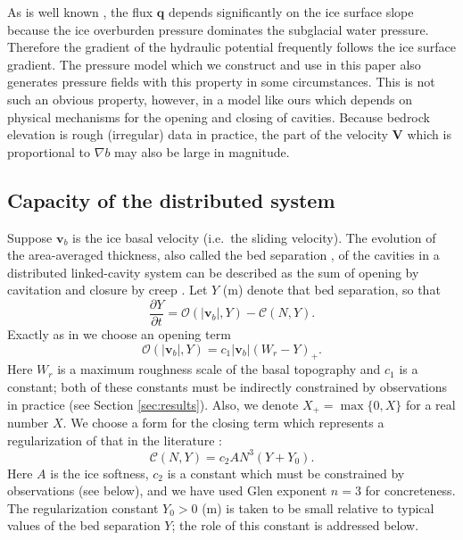 \documentclass[11pt,final]{amsart}
\newcommand\bv{\mathbf{v}}
\newcommand\bV{\mathbf{V}}
\newcommand\bq{\mathbf{q}}
\newcommand{\grad}{\nabla}
\begin{document}
As is well known \citep{Clarke05}, the flux $\bq$ depends significantly on the ice surface slope because the ice overburden pressure dominates the subglacial water pressure.  Therefore the gradient of the hydraulic potential frequently follows the ice surface gradient.  The pressure model which we construct and use in this paper also generates pressure fields with this property in some circumstances.  This is not such an obvious property, however, in a model like ours which depends on physical mechanisms for the opening and closing of cavities.  Because bedrock elevation is rough (irregular) data in practice, the part of the velocity $\bV$ which is proportional to $\grad b$ may also be large in magnitude.



\subsection*{Capacity of the distributed system}  Suppose $\bv_b$ is the ice basal velocity (i.e.~the sliding velocity).  The evolution of the area-averaged thickness, also called the bed separation \citep{Bartholomausetal2011}, of the cavities in a distributed linked-cavity system \citep{Schoofetal2012} can be described as the sum of opening by cavitation and closure by creep \citep{Hewitt2011}.  Let $Y$ (m) denote that bed separation, so that
\begin{equation}
\frac{\partial Y}{\partial t} = \mathcal{O}(|\bv_b|,Y) - \mathcal{C}(N,Y). \label{eq:hewittcapacity}
\end{equation}
Exactly as in \cite{Schoofetal2012} we choose an opening term
\begin{equation}
 \mathcal{O}(|\bv_b|,Y) = c_1 |\bv_b| (W_r - Y)_+. \label{eq:openingform}
\end{equation}
Here $W_r$ is a maximum roughness scale of the basal topography and $c_1$ is a constant; both of these constants must be indirectly constrained by observations in practice (see Section \ref{sec:results}).  Also, we denote $X_+= \max\{0,X\}$ for a real number $X$.  We choose a form for the closing term which represents a regularization of that in the literature \citep{Hewitt2011,Schoofmeltsupply,Schoofetal2012}:
\begin{equation}
\mathcal{C}(N,Y) = c_2 A N^3 (Y+Y_0). \label{eq:closingform}
\end{equation}
Here $A$ is the ice softness, $c_2$ is a constant which must be constrained by observations (see below), and we have used Glen exponent $n=3$ for concreteness.  The regularization constant $Y_0>0$ (m) is taken to be small relative to typical values of the bed separation $Y$; the role of this constant is addressed below.
\end{document}
